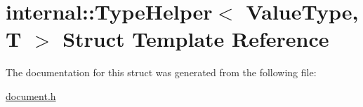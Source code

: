 \hypertarget{a00310}{}\section{internal\+:\+:Type\+Helper$<$ Value\+Type, T $>$ Struct Template Reference}
\label{a00310}


The documentation for this struct was generated from the following file\+:\begin{DoxyCompactItemize}
\item 
\hyperlink{a00473}{document.\+h}\end{DoxyCompactItemize}
